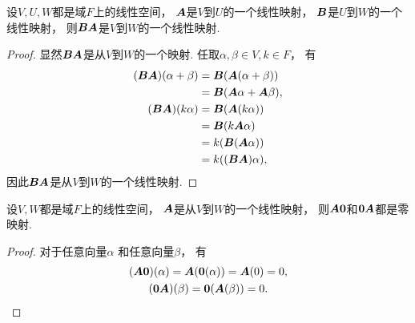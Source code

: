 \begin{proposition}
设\(V,U,W\)都是域\(F\)上的线性空间，
\(\boldsymbol{A}\)是\(V\)到\(U\)的一个线性映射，
\(\boldsymbol{B}\)是\(U\)到\(W\)的一个线性映射，
则\(\boldsymbol{B}\boldsymbol{A}\)是\(V\)到\(W\)的一个线性映射.
\begin{proof}
显然\(\boldsymbol{B}\boldsymbol{A}\)是从\(V\)到\(W\)的一个映射.
任取\(\alpha,\beta \in V,
k \in F\)，
有\begin{align*}
	(\boldsymbol{B}\boldsymbol{A})(\alpha+\beta)
	&= \boldsymbol{B}(\boldsymbol{A}(\alpha+\beta)) \\
	&= \boldsymbol{B}(\boldsymbol{A}\alpha+\boldsymbol{A}\beta), \\
	(\boldsymbol{B}\boldsymbol{A})(k\alpha)
	&= \boldsymbol{B}(\boldsymbol{A}(k \alpha)) \\
	&= \boldsymbol{B}(k \boldsymbol{A}\alpha) \\
	&= k(\boldsymbol{B}(\boldsymbol{A}\alpha)) \\
	&= k((\boldsymbol{B}\boldsymbol{A}) \alpha),
\end{align*}
因此\(\boldsymbol{B}\boldsymbol{A}\)是从\(V\)到\(W\)的一个线性映射.
\end{proof}
\end{proposition}

\begin{proposition}\label{theorem:线性映射.零映射与任意线性映射之积是零映射}
设\(V,W\)都是域\(F\)上的线性空间，
\(\boldsymbol{A}\)是从\(V\)到\(W\)的一个线性映射，
则\(\boldsymbol{A}\boldsymbol0\)和\(\boldsymbol0\boldsymbol{A}\)都是零映射.
\begin{proof}
对于任意向量\(\alpha\)
和任意向量\(\beta\)，
有\begin{gather*}
	(\boldsymbol{A}\boldsymbol0)(\alpha)
	= \boldsymbol{A}(\boldsymbol0(\alpha))
	= \boldsymbol{A}(0)
	= 0, \\
	(\boldsymbol0\boldsymbol{A})(\beta)
	= \boldsymbol0(\boldsymbol{A}(\beta))
	= 0.
	\qedhere
\end{gather*}
\end{proof}
\end{proposition}


